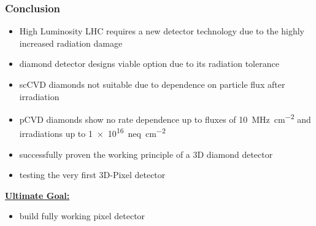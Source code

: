 \begin{frame}
	\frametitle{Conclusion}
	\begin{itemize}
		\setlength{\itemsep}{\fill}
		\item High Luminosity LHC requires a new detector technology due to the highly increased radiation damage 
		\item diamond detector designs viable option due to its radiation tolerance
		\item scCVD diamonds not suitable due to dependence on particle flux after irradiation
		\item pCVD diamonds show no rate dependence up to fluxes of \SI{10}{\mega\hertz\per cm^2} and irradiations up to \SI{1e16}{neq\per cm^2}
		\item successfully proven the working principle of a 3D diamond detector
		\item testing the very first 3D-Pixel detector
	\end{itemize}
	\vspace*{5pt}
	\textbf{\underline{Ultimate Goal:}}
	\begin{itemize}
		\item build fully working pixel detector
	\end{itemize}
\end{frame}